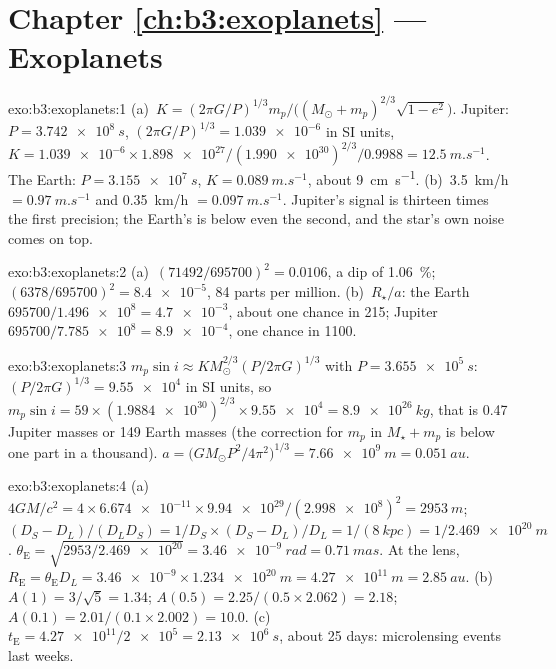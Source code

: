 \section*{Chapter \ref{ch:b3:exoplanets} --- Exoplanets}

\begin{solution}{exo:b3:exoplanets:1}
(a)~$K = (2\pi G/P)^{1/3}m_p/\bigl((M_\odot + m_p)^{2/3}\sqrt{1 - e^2}\bigr)$.
Jupiter: $P = \qty{3.742e8}{s}$, $(2\pi G/P)^{1/3} = \num{1.039e-6}$ in SI
units, $K = \num{1.039e-6}\times\num{1.898e27}/(\num{1.990e30})^{2/3}/0.9988
= \qty{12.5}{m.s^{-1}}$. The Earth: $P = \qty{3.155e7}{s}$, $K =
\qty{0.089}{m.s^{-1}}$, about \qty{9}{cm.s^{-1}}. (b)~\qty{3.5}{km/h} $=
\qty{0.97}{m.s^{-1}}$ and \qty{0.35}{km/h} $= \qty{0.097}{m.s^{-1}}$.
Jupiter's signal is thirteen times the first precision; the Earth's is
below even the second, and the star's own noise comes on top.
\end{solution}

\begin{solution}{exo:b3:exoplanets:2}
(a)~$(71492/695700)^2 = \num{0.0106}$, a dip of \qty{1.06}{\percent};
$(6378/695700)^2 = \num{8.4e-5}$, 84 parts per million. (b)~$R_\star/a$:
the Earth $695700/\num{1.496e8} = \num{4.7e-3}$, about one chance in 215;
Jupiter $695700/\num{7.785e8} = \num{8.9e-4}$, one chance in 1100.
\end{solution}

\begin{solution}{exo:b3:exoplanets:3}
$m_p\sin i \approx K M_\odot^{2/3}(P/2\pi G)^{1/3}$ with $P =
\qty{3.655e5}{s}$: $(P/2\pi G)^{1/3} = \num{9.55e4}$ in SI units, so $m_p
\sin i = 59\times(\num{1.9884e30})^{2/3}\times\num{9.55e4} =
\qty{8.9e26}{kg}$, that is 0.47 Jupiter masses or 149 Earth masses (the
correction for $m_p$ in $M_\star + m_p$ is below one part in a thousand).
$a = \bigl(GM_\odot P^2/4\pi^2\bigr)^{1/3} = \qty{7.66e9}{m} =
\qty{0.051}{au}$.
\end{solution}

\begin{solution}{exo:b3:exoplanets:4}
(a)~$4GM/c^2 = 4\times\num{6.674e-11}\times\num{9.94e29}/(\num{2.998e8})^2 =
\qty{2953}{m}$; $(D_S - D_L)/(D_LD_S) = 1/D_S\times(D_S - D_L)/D_L =
1/(\qty{8}{kpc}) = 1/\qty{2.469e20}{m}$. $\theta_\mathrm E =
\sqrt{2953/\num{2.469e20}} = \qty{3.46e-9}{rad} = \qty{0.71}{mas}$. At the
lens, $R_\mathrm E = \theta_\mathrm E D_L = \num{3.46e-9}\times
\qty{1.234e20}{m} = \qty{4.27e11}{m} = \qty{2.85}{au}$. (b)~$A(1) =
3/\sqrt5 = 1.34$; $A(0.5) = 2.25/(0.5\times2.062) = 2.18$; $A(0.1) =
2.01/(0.1\times2.002) = 10.0$. (c)~$t_\mathrm E = \num{4.27e11}/\num{2e5}
= \qty{2.13e6}{s}$, about 25 days: microlensing events last weeks.
\end{solution}

